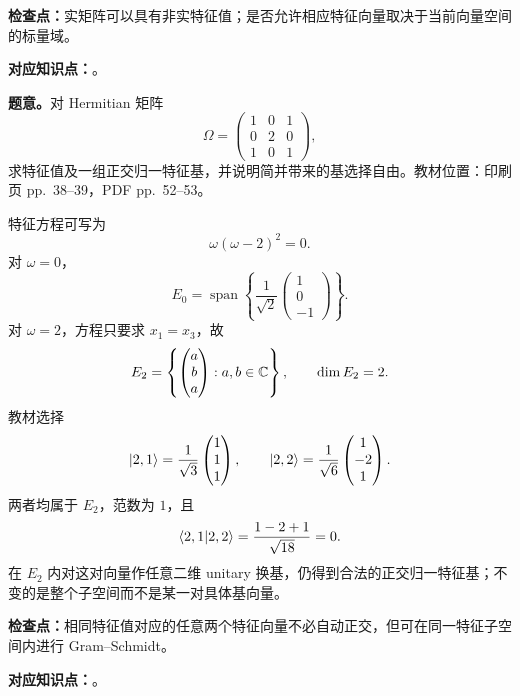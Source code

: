 \textbf{检查点：}实矩阵可以具有非实特征值；是否允许相应特征向量取决于当前向量空间的标量域。


\textbf{对应知识点：}。

\textbf{题意。}对 Hermitian 矩阵
\[
  \Omega=
  \begin{pmatrix}
    1&0&1\\
    0&2&0\\
    1&0&1
  \end{pmatrix},
\]
求特征值及一组正交归一特征基，并说明简并带来的基选择自由。教材位置：印刷页 pp.~38--39，PDF pp.~52--53。

\begin{checkedsolution}
特征方程可写为
\[
  \omega(\omega-2)^2=0.
\]
对 $\omega=0$，
\[
  E_0=\operatorname{span}\left\{
    \frac1{\sqrt2}\begin{pmatrix}1\\0\\-1\end{pmatrix}
  \right\}.
\]
对 $\omega=2$，方程只要求 $x_1=x_3$，故
\[
  E_2=\left\{
    \begin{pmatrix}a\\b\\a\end{pmatrix}:a,b\in\mathbb{C}
  \right\},
  \qquad \dim E_2=2.
\]
教材选择
\[
  \left|2,1\right\rangle=\frac1{\sqrt3}\begin{pmatrix}1\\1\\1\end{pmatrix},
  \qquad
  \left|2,2\right\rangle=\frac1{\sqrt6}\begin{pmatrix}1\\-2\\1\end{pmatrix}.
\]
两者均属于 $E_2$，范数为 $1$，且
\[
  \left\langle 2,1 \middle| 2,2 \right\rangle=\frac{1-2+1}{\sqrt{18}}=0.
\]
在 $E_2$ 内对这对向量作任意二维 unitary 换基，仍得到合法的正交归一特征基；不变的是整个子空间而不是某一对具体基向量。
\end{checkedsolution}

\textbf{检查点：}相同特征值对应的任意两个特征向量不必自动正交，但可在同一特征子空间内进行 Gram--Schmidt。


\textbf{对应知识点：}。


